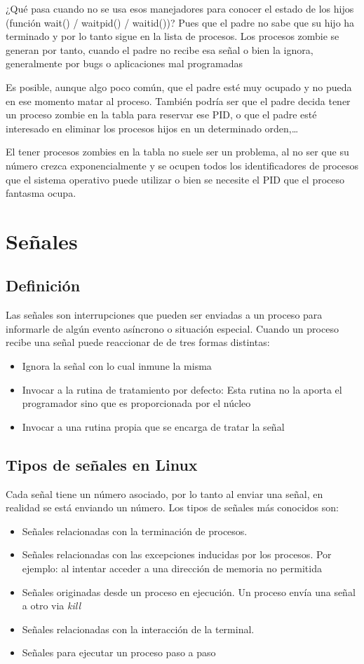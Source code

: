 \documentclass{article}
\begin{document}
	¿Qué pasa cuando no se usa esos manejadores para conocer el estado de los hijos (función wait() / waitpid() / waitid())? 
	Pues que el padre no sabe que su hijo ha terminado y por lo tanto sigue en la lista de procesos.
	Los procesos zombie se generan por tanto, cuando el padre no recibe esa señal o bien la ignora, generalmente por bugs
	o aplicaciones mal programadas
	
	Es posible, aunque algo poco común, que el padre esté muy ocupado y no pueda en ese momento matar al proceso.
	También podría ser que el padre decida tener un proceso zombie en la tabla para reservar ese PID, o que el padre esté
	interesado en eliminar los procesos hijos en un determinado orden,…
	
	El tener procesos zombies en la tabla no suele ser un problema, al no ser que su número crezca exponencialmente y 
	se ocupen todos los identificadores de procesos que el sistema operativo puede utilizar o bien se necesite el PID 
	que el proceso fantasma ocupa. 
	
	\section{Señales}
		\subsection{Definición}
	Las señales son interrupciones que pueden ser enviadas a un proceso para informarle de algún evento asíncrono o situación especial. Cuando un proceso recibe una señal puede reaccionar de de tres formas distintas:
	\begin{itemize}
		\item  Ignora la señal con lo cual inmune la misma
		\item Invocar a la rutina de tratamiento por defecto: Esta rutina no la aporta el programador sino que es proporcionada por el núcleo
		\item Invocar a una rutina propia que se encarga de tratar la señal
	\end{itemize}
	
	\subsection{Tipos de señales en Linux}
	Cada señal tiene un número asociado, por lo tanto al enviar una señal, en realidad se está enviando un número. Los tipos de señales más conocidos son:
	\begin{itemize}
		\item Señales relacionadas con la terminación de procesos.
		\item Señales relacionadas con las excepciones inducidas por los procesos. Por ejemplo: al intentar acceder a una dirección de memoria no permitida
		\item Señales originadas desde un proceso en ejecución. Un proceso envía una señal a otro via \textit{kill}
		\item Señales relacionadas con la interacción de la terminal.
		\item Señales para ejecutar un proceso paso a paso 	
	\end{itemize}
	
\end{document}
